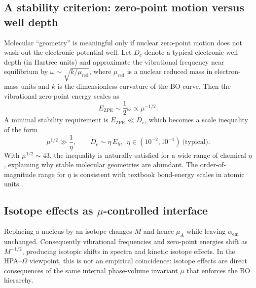 \subsection{A stability criterion: zero-point motion versus well depth}
Molecular ``geometry'' is meaningful only if nuclear zero-point motion does not wash out the electronic potential well. Let $D_e$ denote a typical electronic well depth (in Hartree units) and approximate the vibrational frequency near equilibrium by $\omega\sim \sqrt{k/\mu_{\mathrm{red}}}$, where $\mu_{\mathrm{red}}$ is a nuclear reduced mass in electron-mass units and $k$ is the dimensionless curvature of the BO curve.
Then the vibrational zero-point energy scales as
\begin{equation}
E_{\mathrm{ZPE}}\sim \frac12 \omega \propto \mu^{-1/2}.
\end{equation}
A minimal stability requirement is $E_{\mathrm{ZPE}}\ll D_e$, which becomes a scale inequality of the form
\begin{equation}
\mu^{1/2}\gg \frac{1}{\eta},
\qquad
D_e\sim \eta\,E_h,\ \ \eta\in(10^{-2},10^{-1})\ \text{(typical)}.
\end{equation}
With $\mu^{1/2}\sim 43$, the inequality is naturally satisfied for a wide range of chemical $\eta$, explaining why stable molecular geometries are abundant.
The order-of-magnitude range for $\eta$ is consistent with textbook bond-energy scales in atomic units \cite{AtkinsFriedman2011}.

\subsection{Isotope effects as $\mu$-controlled interface}
Replacing a nucleus by an isotope changes $M$ and hence $\mu_A$ while leaving $\alpha_{\mathrm{em}}$ unchanged. Consequently vibrational frequencies and zero-point energies shift as $M^{-1/2}$, producing isotopic shifts in spectra and kinetic isotope effects. In the HPA--$\Omega$ viewpoint, this is not an empirical coincidence: isotope effects are direct consequences of the same internal phase-volume invariant $\mu$ that enforces the BO hierarchy.


